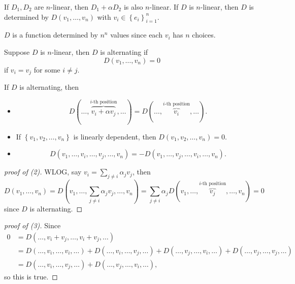 \begin{lemma}
    If \(D_1, D_2\) are \(n\)-linear, then \(D_1 + \alpha D_2\) is also \(n\)-linear. If \(D\) is \(n\)-linear, then \(D\) is determined by \(D(v_1, \dots , v_n)\) with \(v_i \in \left\{ e_i \right\}_{i=1}^n \). 
    \begin{note}
        \(D\) is a function determined by \(n^n\) values since each \(v_i\) has \(n\) choices.
    \end{note}        
\end{lemma}

\begin{definition}[Alternating]
    Suppose \(D\) is \(n\)-linear, then \(D\) is alternating if 
    \[
        D(v_1, \dots , v_n) = 0
    \]  if \(v_i = v_j\) for some \(i \neq j\).  
\end{definition}

\begin{lemma} \label{lm: alternating property}
    If \(D\) is alternating, then 
    \begin{itemize}
        \item [(1)]
        \[
            D ( \dots , \overbrace{v_i + \alpha v_j}^{i\text{-th position}}, \dots ) = D(\dots, \overbrace{v_i}^{i\text{-th position} }, \dots ). 
        \]
        \item [(2)] If \(\left\{ v_1, v_2, \dots , v_n \right\} \) is linearly dependent, then \(D(v_1, v_2, \dots , v_n) = 0\). 
        \item [(3)]
        \[
            D(v_1, \dots , v_i, \dots , v_j, \dots , v_n) = -D(v_1, \dots , v_j, \dots , v_i, \dots , v_n).
        \]
    \end{itemize}
\end{lemma}
\begin{proof}[proof of (2)]
    WLOG, say \(v_i = \sum_{j \neq i} \alpha _j v_j \), then 
    \[
        D(v_1, \dots , v_n) = D \left( v_1, \dots , \sum_{j \neq i} \alpha _j v_j, \dots , v_n \right) = \sum_{j \neq i} \alpha _j D ( v_1, \dots , \overbrace{v_j}^{i\text{-th position} }, \dots , v_n ) = 0   
    \] since \(D\) is alternating. 
    
\end{proof}
\begin{proof}[proof of (3)]
    Since 
    \begin{align*}
        0 &= D(\dots , v_i + v_j, \dots , v_i + v_j, \dots ) \\
        &= D(\dots , v_i, \dots , v_i, \dots ) + D(\dots , v_i, \dots , v_j, \dots ) + D(\dots , v_j, \dots , v_i, \dots ) + D(\dots , v_j, \dots , v_j, \dots ) \\
        &= D(\dots , v_i, \dots , v_j, \dots ) + D(\dots , v_j, \dots , v_i, \dots ), 
    \end{align*}
    so this is true.
\end{proof}

